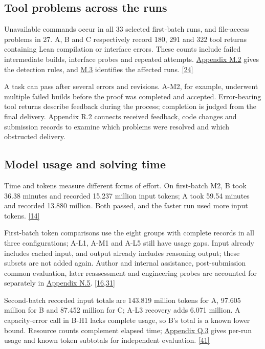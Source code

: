 \subsection[Tool problems across the runs]{\texorpdfstring{\protect\hypertarget{section-3-3}{}Tool problems across the runs}{Tool problems across the runs}}
Unavailable commands occur in all 33 selected first-batch runs, and file-access problems in 27. A, B and C respectively record 180, 291 and 322 tool returns containing Lean compilation or interface errors. These counts include failed intermediate builds, interface probes and repeated attempts. \href{en-appendix.pdf\#m2}{Appendix M.2} gives the detection rules, and \href{en-appendix.pdf\#m3}{M.3} identifies the affected runs. \hyperlink{ref-24}{\mbox{[24]}}

A task can pass after several errors and revisions. A-M2, for example, underwent multiple failed builds before the proof was completed and accepted. Error-bearing tool returns describe feedback during the process; completion is judged from the final delivery. Appendix R.2 connects received feedback, code changes and submission records to examine which problems were resolved and which obstructed delivery.

\subsection[Model usage and solving time]{\texorpdfstring{\protect\hypertarget{section-3-4}{}Model usage and solving time}{Model usage and solving time}}
Time and tokens measure different forms of effort. On first-batch M2, B took 36.38 minutes and recorded 15.237 million input tokens; A took 59.54 minutes and recorded 13.880 million. Both passed, and the faster run used more input tokens. \hyperlink{ref-14}{\mbox{[14]}}

First-batch token comparisons use the eight groups with complete records in all three configurations; A-L1, A-M1 and A-L5 still have usage gaps. Input already includes cached input, and output already includes reasoning output; these subsets are not added again. Author and internal assistance, post-submission common evaluation, later reassessment and engineering probes are accounted for separately in \href{en-appendix.pdf\#n5}{Appendix N.5}. \hyperlink{ref-16}{\mbox{[16,31]}}

Second-batch recorded input totals are 143.819 million tokens for A, 97.605 million for B and 87.452 million for C; A-L3 recovery adds 6.071 million. A capacity-error call in B-H1 lacks complete usage, so B's total is a known lower bound. Resource counts complement elapsed time; \href{en-appendix.pdf\#q3}{Appendix Q.3} gives per-run usage and known token subtotals for independent evaluation. \hyperlink{ref-41}{\mbox{[41]}}


